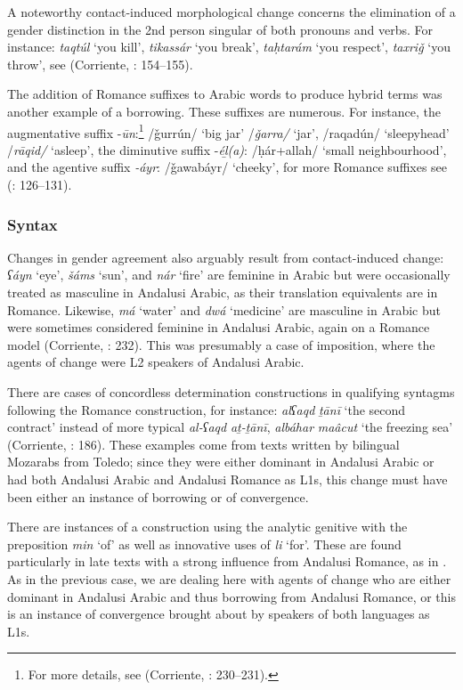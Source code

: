 \documentclass[output=paper,modfonts,nonflat]{langsci/langscibook}
\begin{document}
A noteworthy contact-induced morphological change concerns the elimination of a gender distinction in the 2nd person singular of both pronouns and verbs. For instance: \textit{taqtúl} ‘you kill’, \textit{tikassár} ‘you break’, \textit{taḥtarám} ‘you respect’, \textit{taxriǧ} ‘you throw’, see (Corriente, \citealt{PereiraVicente2015}: 154–155).

The addition of Romance suffixes to Arabic words to produce hybrid terms was another example of a borrowing. These suffixes are numerous. For instance, the augmentative suffix -\textit{ūn}:\footnote{For more details, see (Corriente, \citealt{PereiraVicente2015}: 230–231).} /ǧurrún/ ‘big jar’ /\textit{ǧarra/} ‘jar’, /raqadún/ ‘sleepyhead’ /\textit{rāqid/} ‘asleep’, the diminutive suffix -\textit{éḻ(a)}: /ḥár+allah/ ‘small neighbourhood’, and the agentive suffix \textit{-áyr}: /ǧawabáyr/ ‘cheeky’, for more Romance suffixes see (\citealt{Corriente1992}: 126–131). 




\subsubsection{Syntax}




Changes in gender agreement also arguably result from contact-induced change: \textit{ʕáyn} ‘eye’, \textit{šáms} ‘sun’, and \textit{nár} ‘fire’ are feminine in Arabic but were occasionally treated as masculine in Andalusi Arabic, as their translation equivalents are in Romance. Likewise, \textit{má} ‘water’ and \textit{dwá} ‘medicine’ are masculine in Arabic but were sometimes considered feminine in Andalusi Arabic, again on a Romance model (Corriente, \citealt{PereiraVicente2015}: 232). This was presumably a case of imposition, where the agents of change were L2 speakers of Andalusi Arabic. 

There are cases of concordless determination constructions in qualifying syntagms following the Romance construction, for instance: \textit{alʕaqd} \textit{ṯānī} ‘the second contract’ instead of more typical \textit{al-ʕaqd} \textit{aṯ-ṯānī}, \textit{albáhar} \textit{maâcut} ‘the freezing sea’ (Corriente, \citealt{PereiraVicente2015}: 186). These examples come from texts written by bilingual Mozarabs from Toledo; since they were either dominant in Andalusi Arabic or had both Andalusi Arabic and Andalusi Romance as L1s, this change must have been either an instance of borrowing or of convergence. 

There are instances of a construction using the analytic genitive with the preposition \textit{min} ‘of’ as well as innovative uses of \textit{li} ‘for’. These are found particularly in late texts with a strong influence from Andalusi Romance, as in \citep{Corriente2012}. As in the previous case, we are dealing here with agents of change who are either dominant in Andalusi Arabic and thus borrowing from Andalusi Romance, or this is an instance of convergence brought about by speakers of both languages as L1s.
\end{document}
